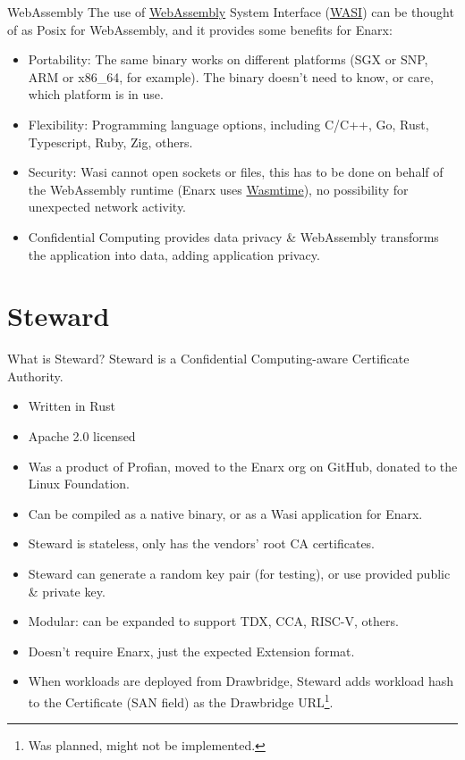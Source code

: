 \documentclass[graphics,compress]{beamer}
\begin{document}
\begin{frame}{WebAssembly}
    The use of \href{https://webassembly.org}{WebAssembly} System Interface (\href{https://wasi.dev}{WASI}) can be thought of as Posix for WebAssembly, and it provides some benefits for Enarx:
    \begin{itemize}
        \item Portability: The same binary works on different platforms (SGX or SNP, ARM or x86\_64, for example). The binary doesn't need to know, or care, which platform is in use.
        \item Flexibility: Programming language options, including C/C++, Go, Rust, Typescript, Ruby, Zig, others.
        \item Security: Wasi cannot open sockets or files, this has to be done on behalf of the WebAssembly runtime (Enarx uses \href{https://wasmtime.dev}{Wasmtime}), no possibility for unexpected network activity.
        \item Confidential Computing provides data privacy \& WebAssembly transforms the application into data, adding application privacy.
    \end{itemize}
\end{frame}

\section{Steward}
\begin{frame}{What is Steward?}
Steward is a Confidential Computing-aware Certificate Authority.
\begin{itemize}
    \item Written in Rust
    \item Apache 2.0 licensed
    \item Was a product of Profian, moved to the Enarx org on GitHub, donated to the Linux Foundation.
    \item Can be compiled as a native binary, or as a Wasi application for Enarx.
    \item Steward is stateless, only has the vendors' root CA certificates.
    \item Steward can generate a random key pair (for testing), or use provided public \& private key.
    \item Modular: can be expanded to support TDX, CCA, RISC-V, others.
    \item Doesn't require Enarx, just the expected Extension format.
    \item When workloads are deployed from Drawbridge, Steward adds workload hash to the Certificate (SAN field) as the Drawbridge URL\footnote{Was planned, might not be implemented.}.
\end{itemize}
\end{frame}
\end{document}
